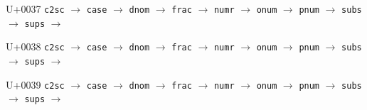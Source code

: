 \documentclass{article}
\begin{document}
\begin{substitutions}
\goodbreak

U+0037  \linebreak
    \texttt{c2sc} $\to$  \linebreak
    \texttt{case} $\to$  \linebreak
    \texttt{dnom} $\to$  \linebreak
    \texttt{frac} $\to$  \linebreak
    \texttt{numr} $\to$  \linebreak
    \texttt{onum} $\to$  \linebreak
    \texttt{pnum} $\to$  \linebreak
    \texttt{subs} $\to$  \linebreak
    \texttt{sups} $\to$  

\goodbreak

U+0038  \linebreak
    \texttt{c2sc} $\to$  \linebreak
    \texttt{case} $\to$  \linebreak
    \texttt{dnom} $\to$  \linebreak
    \texttt{frac} $\to$  \linebreak
    \texttt{numr} $\to$  \linebreak
    \texttt{onum} $\to$  \linebreak
    \texttt{pnum} $\to$  \linebreak
    \texttt{subs} $\to$  \linebreak
    \texttt{sups} $\to$  

\goodbreak

U+0039  \linebreak
    \texttt{c2sc} $\to$  \linebreak
    \texttt{case} $\to$  \linebreak
    \texttt{dnom} $\to$  \linebreak
    \texttt{frac} $\to$  \linebreak
    \texttt{numr} $\to$  \linebreak
    \texttt{onum} $\to$  \linebreak
    \texttt{pnum} $\to$  \linebreak
    \texttt{subs} $\to$  \linebreak
    \texttt{sups} $\to$  


\end{substitutions}
\end{document}
